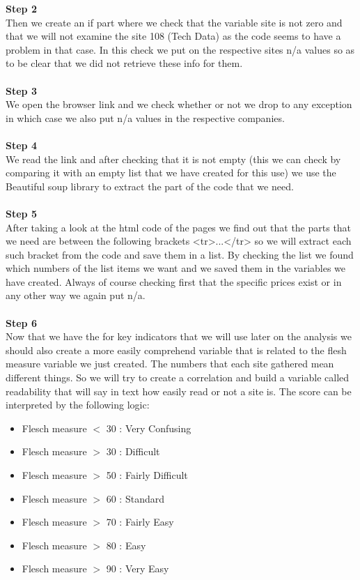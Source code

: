 \documentclass{article}
\begin{document}
\textbf{Step 2} \\Then we create an if part where we check that the variable site is not zero and that we will not examine the site 108 (Tech Data) as the code seems to have a problem in that case. In this check we put on the respective sites n/a values so as to be clear that we did not retrieve these info for them.\\\\
\textbf{Step 3} \\We open the browser link and we check whether or not we drop to any exception in which case we also put n/a values in the respective companies.\\\\
\textbf{Step 4} \\We read the link and after checking that it is not empty (this we  can check by comparing it with an empty list that we have created for this use) we use the Beautiful soup library to extract the part of the code that we need.\\\\
\textbf{Step 5} \\After taking a look at the html code of the pages we find out that the parts that we need are between the following brackets <tr>...</tr> so we will extract each such bracket from the code and save them in a list. By checking the list we found which numbers of the list items we want and we saved them in the variables we have created. Always of course checking first that the specific prices exist or in any other way we again put n/a.\\\\
\textbf{Step 6} \\Now that we have the for key indicators that we will use later on the analysis we should also create a more easily comprehend variable that is related to the flesh measure variable we just created. The numbers that each site gathered mean different things. So we will try to create a correlation and build a variable called readability that will say in text how easily read or not a site is. The score can be interpreted by the following logic:
\begin{itemize}
\item Flesch measure $<$ 30 : Very Confusing
\item Flesch measure $>$ 30 : Difficult
\item Flesch measure $>$ 50 : Fairly Difficult
\item Flesch measure $>$ 60 : Standard
\item Flesch measure $>$ 70 : Fairly Easy
\item Flesch measure $>$ 80 : Easy
\item Flesch measure $>$ 90 : Very Easy
\end{itemize}
\end{document}
